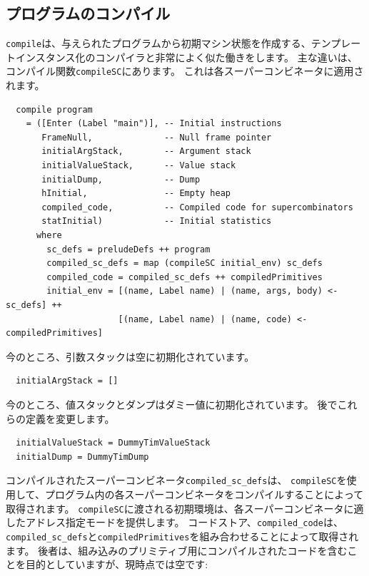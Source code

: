 \documentclass{jbook}
\begin{document}
\subsection{プログラムのコンパイル}

\texttt{compile}は、与えられたプログラムから初期マシン状態を作成する、テンプレートインスタンス化のコンパイラと非常によく似た働きをします。
主な違いは、コンパイル関数\texttt{compileSC}にあります。
これは各スーパーコンビネータに適用されます。

\begin{verbatim}
  compile program
    = ([Enter (Label "main")], -- Initial instructions
       FrameNull,              -- Null frame pointer
       initialArgStack,        -- Argument stack
       initialValueStack,      -- Value stack
       initialDump,            -- Dump
       hInitial,               -- Empty heap
       compiled_code,          -- Compiled code for supercombinators
       statInitial)            -- Initial statistics
      where
        sc_defs = preludeDefs ++ program
        compiled_sc_defs = map (compileSC initial_env) sc_defs
        compiled_code = compiled_sc_defs ++ compiledPrimitives
        initial_env = [(name, Label name) | (name, args, body) <- sc_defs] ++
                      [(name, Label name) | (name, code) <- compiledPrimitives]
\end{verbatim}

今のところ、引数スタックは空に初期化されています。

\begin{verbatim}
  initialArgStack = []
\end{verbatim}

今のところ、値スタックとダンプはダミー値に初期化されています。
後でこれらの定義を変更します。

\begin{verbatim}
  initialValueStack = DummyTimValueStack
  initialDump = DummyTimDump
\end{verbatim}

コンパイルされたスーパーコンビネータ\texttt{compiled\_sc\_defs}は、
\texttt{compileSC}を使用して、プログラム内の各スーパーコンビネータをコンパイルすることによって取得されます。
\texttt{compileSC}に渡される初期環境は、各スーパーコンビネータに適したアドレス指定モードを提供します。
コードストア、\texttt{compiled\_code}は、\texttt{compiled\_sc\_defs}と\texttt{compiledPrimitives}を組み合わせることによって取得されます。
後者は、組み込みのプリミティブ用にコンパイルされたコードを含むことを目的としていますが、現時点では空です:
\end{document}
